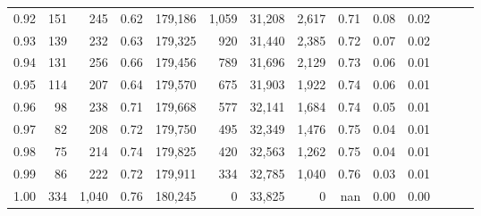\begin{tabular}{rrrrrrrrrrrrrr}
0.92 &    151 &    245 &  0.62 &  179,186 &    1,059 &  31,208 &   2,617 &  0.71 &  0.08 &      0.02 \\
0.93 &    139 &    232 &  0.63 &  179,325 &      920 &  31,440 &   2,385 &  0.72 &  0.07 &      0.02 \\
0.94 &    131 &    256 &  0.66 &  179,456 &      789 &  31,696 &   2,129 &  0.73 &  0.06 &      0.01 \\
0.95 &    114 &    207 &  0.64 &  179,570 &      675 &  31,903 &   1,922 &  0.74 &  0.06 &      0.01 \\
0.96 &     98 &    238 &  0.71 &  179,668 &      577 &  32,141 &   1,684 &  0.74 &  0.05 &      0.01 \\
0.97 &     82 &    208 &  0.72 &  179,750 &      495 &  32,349 &   1,476 &  0.75 &  0.04 &      0.01 \\
0.98 &     75 &    214 &  0.74 &  179,825 &      420 &  32,563 &   1,262 &  0.75 &  0.04 &      0.01 \\
0.99 &     86 &    222 &  0.72 &  179,911 &      334 &  32,785 &   1,040 &  0.76 &  0.03 &      0.01 \\
1.00 &    334 &  1,040 &  0.76 &  180,245 &        0 &  33,825 &       0 &   nan &  0.00 &      0.00 \\
\bottomrule
\end{tabular}
